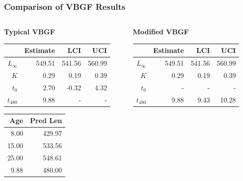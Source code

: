 \documentclass[xcolor=dvipsnames,t]{beamer}\usepackage[]{graphicx}\usepackage[]{color}
\begin{document}
\begin{frame}[fragile]
\frametitle{Comparison of VBGF Results}
\begin{columns}
\begin{column}{0.5\textwidth}
\textbf{Typical VBGF}
\begin{table}[ht]
\centering
\begin{tabular}{rrrr}
  \hline
 & Estimate & LCI & UCI \\ 
  \hline
$L_{\infty}$ & 549.51 & 541.56 & 560.99 \\ 
  $K$ & 0.29 & 0.19 & 0.39 \\ 
  $t_{0}$ & 2.70 & -0.32 & 4.32 \\ 
  $t_{480}$ & 9.88 & - & - \\ 
   \hline
\end{tabular}
\end{table}

\smallskip
\begin{table}[ht]
\centering
\begin{tabular}{rr}
  \hline
Age & Pred Len \\ 
  \hline
8.00 & 429.97 \\ 
  15.00 & 533.56 \\ 
  25.00 & 548.61 \\ 
  9.88 & 480.00 \\ 
   \hline
\end{tabular}
\end{table}

\end{column}
\begin{column}{0.5\textwidth}
\textbf{Modified VBGF}
\begin{table}[ht]
\centering
\begin{tabular}{rrrr}
  \hline
 & Estimate & LCI & UCI \\ 
  \hline
$L_{\infty}$ & 549.51 & 541.56 & 560.99 \\ 
  $K$ & 0.29 & 0.19 & 0.39 \\ 
  $t_{0}$ & - & - & - \\ 
  $t_{480}$ & 9.88 & 9.43 & 10.28 \\ 
   \hline
\end{tabular}
\end{table}


\end{column}
\end{columns}
\end{frame}
\end{document}
